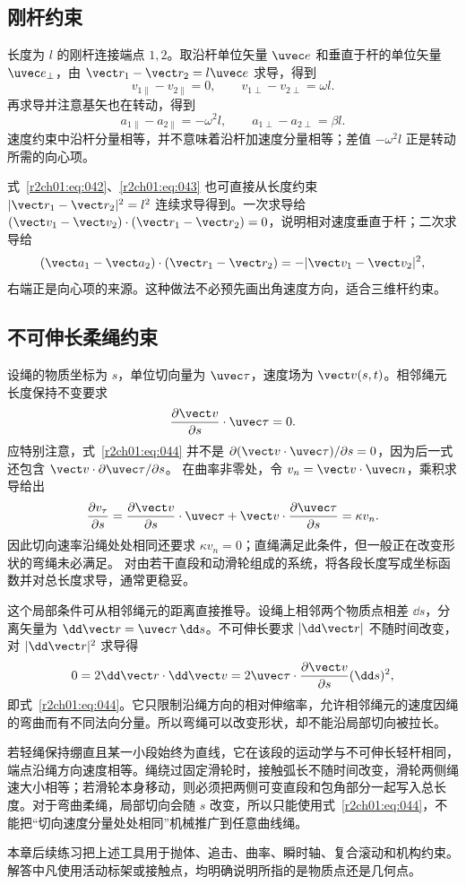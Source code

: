 \subsection{刚杆约束}
\label{r2ch01:sec:rod}

长度为 $l$ 的刚杆连接端点 $1,2$。取沿杆单位矢量 $\uvec e$ 和垂直于杆的单位矢量 $\uvec e_\perp$，由 $\vect r_1-\vect r_2=l\uvec e$ 求导，得到
\begin{equation}
  v_{1\parallel}-v_{2\parallel}=0,
  \qquad
  v_{1\perp}-v_{2\perp}=\omega l.
  \label{r2ch01:eq:042}
\end{equation}
再求导并注意基矢也在转动，得到
\begin{equation}
  a_{1\parallel}-a_{2\parallel}=-\omega^2l,
  \qquad
  a_{1\perp}-a_{2\perp}=\beta l.
  \label{r2ch01:eq:043}
\end{equation}
速度约束中沿杆分量相等，并不意味着沿杆加速度分量相等；差值 $-\omega^2l$ 正是转动所需的向心项。

式~\eqref{r2ch01:eq:042}、\eqref{r2ch01:eq:043} 也可直接从长度约束
$|\vect r_1-\vect r_2|^2=l^2$ 连续求导得到。一次求导给
$(\vect v_1-\vect v_2)\cdot(\vect r_1-\vect r_2)=0$，说明相对速度垂直于杆；二次求导给
\[
  (\vect a_1-\vect a_2)\cdot(\vect r_1-\vect r_2)
  =-|\vect v_1-\vect v_2|^2,
\]
右端正是向心项的来源。这种做法不必预先画出角速度方向，适合三维杆约束。

\subsection{不可伸长柔绳约束}
\label{r2ch01:sec:rope}

设绳的物质坐标为 $s$，单位切向量为 $\uvec\tau$，速度场为 $\vect v(s,t)$。相邻绳元长度保持不变要求
\begin{equation}
  \frac{\partial\vect v}{\partial s}\cdot\uvec\tau=0.
  \label{r2ch01:eq:044}
\end{equation}
应特别注意，式~\eqref{r2ch01:eq:044} 并不是 $\partial(\vect v\cdot\uvec\tau)/\partial s=0$，因为后一式还包含 $\vect v\cdot\partial\uvec\tau/\partial s$。
在曲率非零处，令 $v_n=\vect v\cdot\uvec n$，乘积求导给出
\[
 \frac{\partial v_\tau}{\partial s}
 =\frac{\partial\vect v}{\partial s}\cdot\uvec\tau
   +\vect v\cdot\frac{\partial\uvec\tau}{\partial s}
 =\kappa v_n.
\]
因此切向速率沿绳处处相同还要求 $\kappa v_n=0$；直绳满足此条件，但一般正在改变形状的弯绳未必满足。
对由若干直段和动滑轮组成的系统，将各段长度写成坐标函数并对总长度求导，通常更稳妥。

这个局部条件可从相邻绳元的距离直接推导。设绳上相邻两个物质点相差 $\dd s$，分离矢量为
$\dd\vect r=\uvec\tau\,\dd s$。不可伸长要求 $|\dd\vect r|$ 不随时间改变，对 $|\dd\vect r|^2$ 求导得
\[
  0=2\dd\vect r\cdot\dd\vect v
  =2\uvec\tau\cdot\frac{\partial\vect v}{\partial s}(\dd s)^2,
\]
即式~\eqref{r2ch01:eq:044}。它只限制沿绳方向的相对伸缩率，允许相邻绳元的速度因绳的弯曲而有不同法向分量。所以弯绳可以改变形状，却不能沿局部切向被拉长。

若轻绳保持绷直且某一小段始终为直线，它在该段的运动学与不可伸长轻杆相同，端点沿绳方向速度相等。绳绕过固定滑轮时，接触弧长不随时间改变，滑轮两侧绳速大小相等；若滑轮本身移动，则必须把两侧可变直段和包角部分一起写入总长度。对于弯曲柔绳，局部切向会随 $s$ 改变，所以只能使用式~\eqref{r2ch01:eq:044}，不能把“切向速度分量处处相同”机械推广到任意曲线绳。

本章后续练习把上述工具用于抛体、追击、曲率、瞬时轴、复合滚动和机构约束。解答中凡使用活动标架或接触点，均明确说明所指的是物质点还是几何点。
